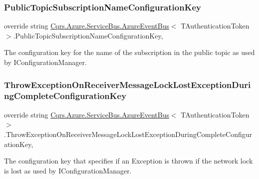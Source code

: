 \subsubsection{\texorpdfstring{Public\+Topic\+Subscription\+Name\+Configuration\+Key}{PublicTopicSubscriptionNameConfigurationKey}}
{\footnotesize\ttfamily override string \hyperlink{classCqrs_1_1Azure_1_1ServiceBus_1_1AzureEventBus}{Cqrs.\+Azure.\+Service\+Bus.\+Azure\+Event\+Bus}$<$ T\+Authentication\+Token $>$.Public\+Topic\+Subscription\+Name\+Configuration\+Key\hspace{0.3cm}{\ttfamily [get]}, {\ttfamily [protected]}}



The configuration key for the name of the subscription in the public topic as used by I\+Configuration\+Manager. 

\mbox{\label{classCqrs_1_1Azure_1_1ServiceBus_1_1AzureEventBus_aaf0a0d07f6c5c1940cb633b362aa7177_aaf0a0d07f6c5c1940cb633b362aa7177}} 
\subsubsection{\texorpdfstring{Throw\+Exception\+On\+Receiver\+Message\+Lock\+Lost\+Exception\+During\+Complete\+Configuration\+Key}{ThrowExceptionOnReceiverMessageLockLostExceptionDuringCompleteConfigurationKey}}
{\footnotesize\ttfamily override string \hyperlink{classCqrs_1_1Azure_1_1ServiceBus_1_1AzureEventBus}{Cqrs.\+Azure.\+Service\+Bus.\+Azure\+Event\+Bus}$<$ T\+Authentication\+Token $>$.Throw\+Exception\+On\+Receiver\+Message\+Lock\+Lost\+Exception\+During\+Complete\+Configuration\+Key\hspace{0.3cm}{\ttfamily [get]}, {\ttfamily [protected]}}



The configuration key that specifies if an Exception is thrown if the network lock is lost as used by I\+Configuration\+Manager. 

